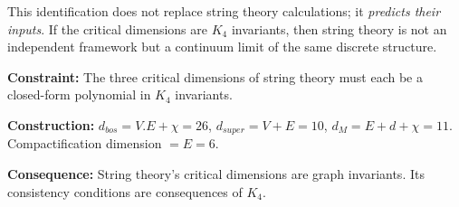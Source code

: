\documentclass[11pt,a4paper]{book}
\def\cdot{.}%
\def\mathrm#1{#1}%
\newcommand{\VoidRef}[2]{\textit{#2} (in \textit{Void})}
\begin{document}
This identification does not replace string theory calculations; it \emph{predicts their inputs}. If the critical dimensions are $K_4$ invariants, then string theory is not an independent framework but a continuum limit of the same discrete structure.


\textbf{Constraint:} The three critical dimensions of string theory must each be a closed-form polynomial in $K_4$ invariants.

\textbf{Construction:} $d_{\mathrm{bos}} = V \cdot E + \chi = 26$, $d_{\mathrm{super}} = V + E = 10$, $d_{\mathrm{M}} = E + d + \chi = 11$. Compactification dimension $= E = 6$.

\textbf{Consequence:} String theory's critical dimensions are graph invariants. Its consistency conditions are consequences of $K_4$.
\end{document}
